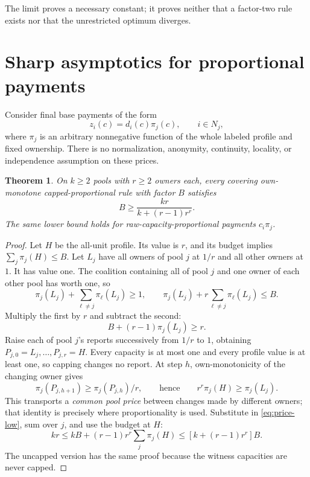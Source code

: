 \documentclass[11pt]{article}
\newtheorem{theorem}{Theorem}[section]
\theoremstyle{definition}\newtheorem{definition}[theorem]{Definition}
\theoremstyle{remark}\newtheorem{remark}[theorem]{Remark}
\begin{document}
The limit proves a necessary constant; it proves neither that a factor-two
rule exists nor that the unrestricted optimum diverges.

\section{Sharp asymptotics for proportional payments}\label{sec:prop}
Consider final base payments of the form
\[
 z_i(c)=d_i(c)\pi_j(c),\qquad i\in N_j,
\]
where $\pi_j$ is an arbitrary nonnegative function of the whole labeled
profile and fixed ownership. There is no normalization, anonymity,
continuity, locality, or independence assumption on these prices.

\begin{theorem}\label{thm:prop}
On $k\ge2$ pools with $r\ge2$ owners each, every covering own-monotone
capped-proportional rule with factor $B$ satisfies
\begin{equation}\label{eq:prop}
 B\ge\frac{kr}{k+(r-1)r^r}.
\end{equation}
The same lower bound holds for raw-capacity-proportional payments $c_i\pi_j$.
\end{theorem}
\begin{proof}
Let $H$ be the all-unit profile. Its value is $r$, and its budget implies
$\sum_j\pi_j(H)\le B$. Let $L_j$ have all owners of pool $j$ at $1/r$
and all other owners at $1$. It has value one. The coalition containing all
of pool $j$ and one owner of each other pool has worth one, so
\[
 \pi_j(L_j)+\sum_{\ell\ne j}\pi_\ell(L_j)\ge1,
 \qquad \pi_j(L_j)+r\sum_{\ell\ne j}\pi_\ell(L_j)\le B.
\]
Multiply the first by $r$ and subtract the second:
\begin{equation}\label{eq:price-low}
 B+(r-1)\pi_j(L_j)\ge r.
\end{equation}
Raise each of pool $j$'s reports successively from $1/r$ to $1$, obtaining
$P_{j,0}=L_j,\ldots,P_{j,r}=H$. Every capacity is at most one and every
profile value is at least one, so capping changes no report. At step $h$,
own-monotonicity of the changing owner gives
\[
 \pi_j(P_{j,h+1})\ge\pi_j(P_{j,h})/r,
 \qquad\text{hence}\qquad r^r\pi_j(H)\ge\pi_j(L_j).
\]
This transports a \emph{common pool price} between changes made by different
owners; that identity is precisely where proportionality is used. Substitute
in \eqref{eq:price-low}, sum over $j$, and use the budget at $H$:
\[
 kr\le kB+(r-1)r^r\sum_j\pi_j(H)
 \le[k+(r-1)r^r]B.
\]
The uncapped version has the same proof because the witness capacities are
never capped.
\end{proof}
\end{document}
